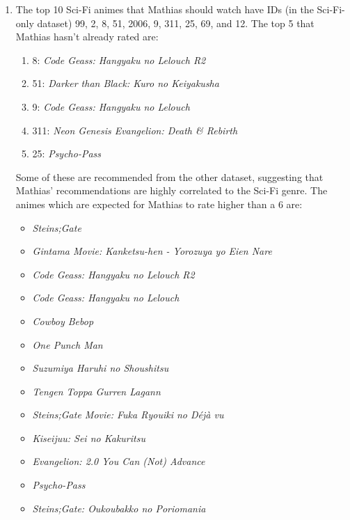 \documentclass[11pt,a4paper]{article}
\begin{document}
\begin{enumerate}
\item The top 10 Sci-Fi animes that Mathias should watch have IDs (in the Sci-Fi-only dataset) 
          99,
           2,
           8,
          51,
        2006,
           9,
         311,
          25,
          69, and
          12.
The top 5 that Mathias hasn't already rated are:
\begin{enumerate}
  \item 8: \emph{Code Geass: Hangyaku no Lelouch R2}
  \item 51: \emph{Darker than Black: Kuro no Keiyakusha}
  \item 9: \emph{Code Geass: Hangyaku no Lelouch}
  \item 311: \emph{Neon Genesis Evangelion: Death \& Rebirth}
  \item 25:  \emph{Psycho-Pass}
\end{enumerate}
Some of these are recommended from the other dataset, suggesting that Mathias' recommendations are highly correlated to the Sci-Fi genre.
The animes which are expected for Mathias to rate higher than a 6 are:
\begin{itemize}
\item  \emph{    Steins;Gate   }                                      
\item  \emph{       Gintama Movie: Kanketsu-hen - Yorozuya yo Eien Nare }
\item  \emph{       Code Geass: Hangyaku no Lelouch R2        }          
\item  \emph{       Code Geass: Hangyaku no Lelouch            }         
\item  \emph{       Cowboy Bebop                               }         
\item  \emph{       One Punch Man                               }        
\item  \emph{       Suzumiya Haruhi no Shoushitsu                }       
\item  \emph{       Tengen Toppa Gurren Lagann                    }      
\item  \emph{       Steins;Gate Movie: Fuka Ryouiki no Déjà vu     }     
\item  \emph{       Kiseijuu: Sei no Kakuritsu                      }    
\item  \emph{       Evangelion: 2.0 You Can (Not) Advance            }   
\item  \emph{       Psycho-Pass                                       }  
\item  \emph{       Steins;Gate: Oukoubakko no Poriomania              } 

\end{itemize}
\end{enumerate}
\end{document}
